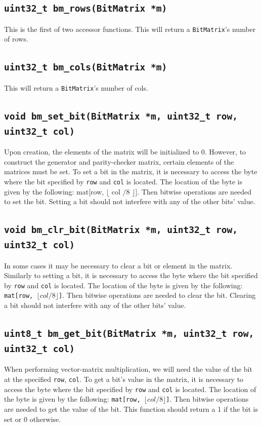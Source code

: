 \documentclass[11pt]{article}
\begin{document}
\subsection{\texttt{uint32\_t bm\_rows(BitMatrix *m)}}
This is the first of two accessor functions. This will return a \texttt{BitMatrix}'s number of rows.

\subsection{\texttt{uint32\_t bm\_cols(BitMatrix *m)}}
This will return a \texttt{BitMatrix}'s number of cols.

\subsection{\texttt{void bm\_set\_bit(BitMatrix *m, uint32\_t row, uint32\_t col)}}
Upon creation, the elements of the matrix will be initialized to 0. However, to construct
the generator and parity-checker matrix, certain elements of the matrices must be set.
To set a bit in the matrix, it is necessary to access the byte where the bit specified
by \texttt{row} and \texttt{col} is located. The location of the byte is given by the
following: mat[row, $\lfloor$ col $/ 8$ $\rfloor$].
Then bitwise operations are needed to set the bit.
Setting a bit should not interfere with any of the other bits' value.

\subsection{\texttt{void bm\_clr\_bit(BitMatrix *m, uint32\_t row, uint32\_t col)}}
In some cases it may be necessary to clear a bit or element in the matrix. Similarly
to setting a bit, it is necessary to access the byte where the bit specified
by \texttt{row} and \texttt{col} is located. The location of the byte is given by the
following: \texttt{mat[row, $\lfloor col / 8 \rfloor$]}.
Then bitwise operations are needed to clear the bit.
Clearing a bit should not interfere with any of the other bits' value.

\subsection{\texttt{uint8\_t bm\_get\_bit(BitMatrix *m, uint32\_t row, uint32\_t col)}}
When performing vector-matrix multiplication, we will need the value of the bit at the
specified \texttt{row}, \texttt{col}. To get a bit's value in the matrix, 
it is necessary to access the byte where the bit specified
by \texttt{row} and \texttt{col} is located. The location of the byte is given by the
following: \texttt{mat[row, $\lfloor col / 8 \rfloor$]}. Then bitwise operations are needed
to get the value of the bit. This function should return a 1 if the bit is set or 0 otherwise.
\end{document}
